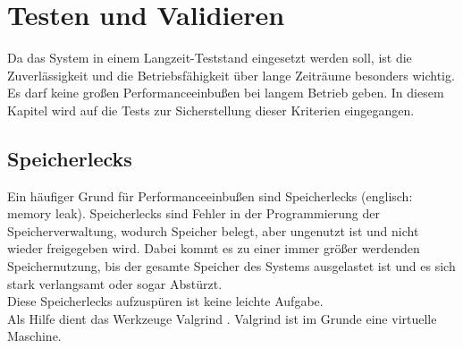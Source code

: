 
\chapter{Testen und Validieren}
\label{chapter_Testen_und_Validieren}

Da das System in einem Langzeit-Teststand eingesetzt werden soll, ist die Zuverlässigkeit und die Betriebsfähigkeit über lange Zeiträume besonders wichtig. Es darf keine großen Performanceeinbußen bei langem Betrieb geben. In diesem Kapitel wird auf die Tests zur Sicherstellung dieser Kriterien eingegangen.

\section{Speicherlecks}

Ein häufiger Grund für Performanceeinbußen sind Speicherlecks (englisch: memory leak). Speicherlecks sind Fehler in der Programmierung der Speicherverwaltung, wodurch Speicher belegt, aber ungenutzt ist und nicht wieder freigegeben wird. Dabei kommt es zu einer immer größer werdenden Speichernutzung, bis der gesamte Speicher des Systems ausgelastet ist und es sich stark verlangsamt oder sogar Abstürzt.\\
Diese Speicherlecks aufzuspüren ist keine leichte Aufgabe. \\
Als Hilfe dient das Werkzeuge Valgrind \cite{valgrind}. Valgrind ist im Grunde eine virtuelle Maschine.
